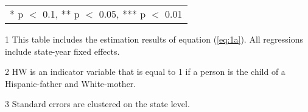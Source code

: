 \begin{table}[H]
\begin{threeparttable}
\begin{tabular}[t]{lcccc}
\bottomrule
\multicolumn{5}{l}{\rule{0pt}{1em}* p $<$ 0.1, ** p $<$ 0.05, *** p $<$ 0.01}\\
\end{tabular}
\begin{tablenotes}
\item[1] {\footnotesize{This table includes the estimation results of equation (\ref{eq:1a}). All regressions include state-year fixed effects.}}
\item[2] {\footnotesize{HW is an indicator variable that is equal to 1 if a person is the child of a Hispanic-father and White-mother.}}
\item[3] {\footnotesize{Standard errors are clustered on the state level.}}
\end{tablenotes}
\end{threeparttable}
\end{table}
